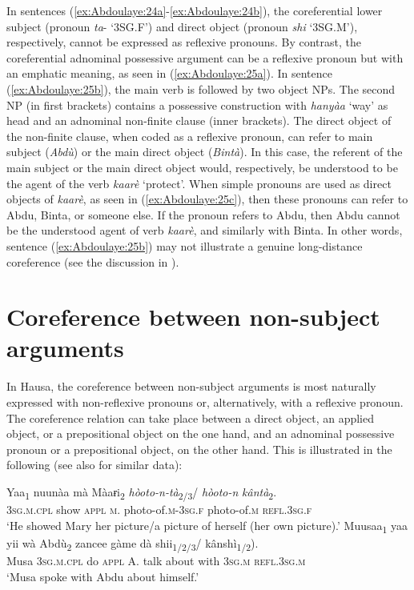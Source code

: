 \documentclass[output=paper]{langscibook}
\begin{document}
In sentences (\ref{ex:Abdoulaye:24a}-\ref{ex:Abdoulaye:24b}), the coreferential lower subject (pronoun \textit{ta}\nobreakdash- `3SG.F’) and direct object (pronoun \textit{shi} `3SG.M’), respectively, cannot be expressed as reflexive pronouns. By contrast, the coreferential adnominal possessive argument can be a reflexive pronoun but with an emphatic meaning, as seen in (\ref{ex:Abdoulaye:25a}). In sentence (\ref{ex:Abdoulaye:25b}), the main verb is followed by two object NPs. The second NP (in first brackets) contains a possessive construction with \textit{hanyàa} ‘way’ as head and an adnominal non-finite clause (inner brackets). The direct object of the non-finite clause, when coded as a reflexive pronoun, can refer to main subject (\textit{Abdù}) or the main direct object (\textit{Bintà}). In this case, the referent of the main subject or the main direct object would, respectively, be understood to be the agent of the verb \textit{kaarè} ‘protect’. When simple pronouns are used as direct objects of \textit{kaarè}, as seen in (\ref{ex:Abdoulaye:25c}), then these pronouns can refer to Abdu, Binta, or someone else. If the pronoun refers to Abdu, then Abdu cannot be the understood agent of verb \textit{kaarè}, and similarly with Binta. In other words, sentence (\ref{ex:Abdoulaye:25b}) may not illustrate a genuine long-distance coreference (see the discussion in \citealt[14, note 15]{Haspelmath2020a}).


\section{Coreference between non-subject arguments} \label{sec:Abdoulaye:5}

In Hausa, the coreference between non-subject arguments is most naturally expressed with non-reflexive pronouns or, alternatively, with a reflexive pronoun. The coreference relation can take place between a direct object, an applied object, or a prepositional object on the one hand, and an adnominal possessive pronoun or a prepositional object, on the other hand. This is illustrated in the following (see also \citealt[523]{Newman2000} for similar data):


\ea%
    \label{ex:Abdoulaye:26}
    \ea \label{ex:Abdoulaye:26a}
    \gll Yaa\textsubscript{1} nuunàa  mà  Màaɍi\textsubscript{2} \textit{hòoto-n-tà}\textsubscript{2/3}/  \textit{hòoto-n}  \textit{kântà}\textsubscript{2}. \\
    \textsc{3sg.m.cpl}  show  \textsc{appl}  \textsc{m}.  photo-of.\textsc{m-3sg.f}  photo-of.\textsc{m}  \textsc{refl.3sg.f}\\
    \glt `He showed Mary her picture/a picture of herself (her own picture).’
    \ex \label{ex:Abdoulaye:26b}
    \gll  Muusaa\textsubscript{1}  yaa  yii  wà  Abdù\textsubscript{2}  zancee  gàme  dà  shii\textsubscript{1/2/3}/ kânshì\textsubscript{1/2}).\\
    Musa  \textsc{3sg.m.cpl}  do  \textsc{appl}  A.  talk  about  with  \textsc{3sg.m} \textsc{refl.3sg.m}\\
    \glt `Musa spoke with Abdu about himself.’
    \z
\z
\end{document}
